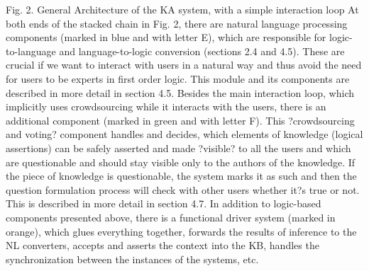 Fig. 2. General Architecture of the KA system, with a simple interaction loop
At both ends of the stacked chain in Fig. 2, there are natural language processing components (marked in blue and with letter E), which are responsible for logic-to-language and language-to-logic conversion (sections 2.4 and 4.5). These are crucial if we want to interact with users in a natural way and thus avoid the need for users to be experts in first order logic. This module and its components are described in more detail in section 4.5.  
Besides the main interaction loop, which implicitly uses crowdsourcing while it interacts with the users, there is an additional component (marked in green and with letter F). This ?crowdsourcing and voting? component handles and decides, which elements of knowledge (logical assertions) can be safely asserted and made ?visible? to all the users and which are questionable and should stay visible only to the authors of the knowledge. If the piece of knowledge is questionable, the system marks it as such and then the question formulation process will check with other users whether it?s true or not. This is described in more detail in section 4.7.
In addition to logic-based components presented above, there is a functional driver system (marked in orange), which glues everything together, forwards the results of inference to the NL converters, accepts and asserts the context into the KB, handles the synchronization between the instances of the systems, etc.
